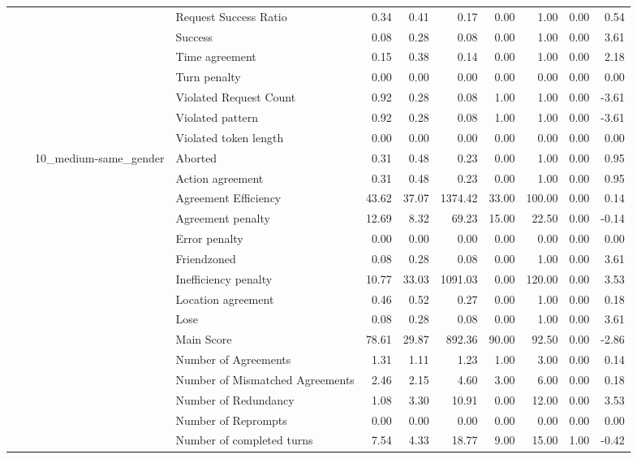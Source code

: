 \begin{tabular}{llllrrrrrrr}
 &  &  & Request Success Ratio & 0.34 & 0.41 & 0.17 & 0.00 & 1.00 & 0.00 & 0.54 \\
 &  &  & Success & 0.08 & 0.28 & 0.08 & 0.00 & 1.00 & 0.00 & 3.61 \\
 &  &  & Time agreement & 0.15 & 0.38 & 0.14 & 0.00 & 1.00 & 0.00 & 2.18 \\
 &  &  & Turn penalty & 0.00 & 0.00 & 0.00 & 0.00 & 0.00 & 0.00 & 0.00 \\
 &  &  & Violated Request Count & 0.92 & 0.28 & 0.08 & 1.00 & 1.00 & 0.00 & -3.61 \\
 &  &  & Violated pattern & 0.92 & 0.28 & 0.08 & 1.00 & 1.00 & 0.00 & -3.61 \\
 &  &  & Violated token length & 0.00 & 0.00 & 0.00 & 0.00 & 0.00 & 0.00 & 0.00 \\
\cline{3-11}
 &  & \multirow[t]{27}{*}{10_medium-same_gender} & Aborted & 0.31 & 0.48 & 0.23 & 0.00 & 1.00 & 0.00 & 0.95 \\
 &  &  & Action agreement & 0.31 & 0.48 & 0.23 & 0.00 & 1.00 & 0.00 & 0.95 \\
 &  &  & Agreement Efficiency & 43.62 & 37.07 & 1374.42 & 33.00 & 100.00 & 0.00 & 0.14 \\
 &  &  & Agreement penalty & 12.69 & 8.32 & 69.23 & 15.00 & 22.50 & 0.00 & -0.14 \\
 &  &  & Error penalty & 0.00 & 0.00 & 0.00 & 0.00 & 0.00 & 0.00 & 0.00 \\
 &  &  & Friendzoned & 0.08 & 0.28 & 0.08 & 0.00 & 1.00 & 0.00 & 3.61 \\
 &  &  & Inefficiency penalty & 10.77 & 33.03 & 1091.03 & 0.00 & 120.00 & 0.00 & 3.53 \\
 &  &  & Location agreement & 0.46 & 0.52 & 0.27 & 0.00 & 1.00 & 0.00 & 0.18 \\
 &  &  & Lose & 0.08 & 0.28 & 0.08 & 0.00 & 1.00 & 0.00 & 3.61 \\
 &  &  & Main Score & 78.61 & 29.87 & 892.36 & 90.00 & 92.50 & 0.00 & -2.86 \\
 &  &  & Number of Agreements & 1.31 & 1.11 & 1.23 & 1.00 & 3.00 & 0.00 & 0.14 \\
 &  &  & Number of Mismatched Agreements & 2.46 & 2.15 & 4.60 & 3.00 & 6.00 & 0.00 & 0.18 \\
 &  &  & Number of Redundancy & 1.08 & 3.30 & 10.91 & 0.00 & 12.00 & 0.00 & 3.53 \\
 &  &  & Number of Reprompts & 0.00 & 0.00 & 0.00 & 0.00 & 0.00 & 0.00 & 0.00 \\
 &  &  & Number of completed turns & 7.54 & 4.33 & 18.77 & 9.00 & 15.00 & 1.00 & -0.42 \\

\end{tabular}
